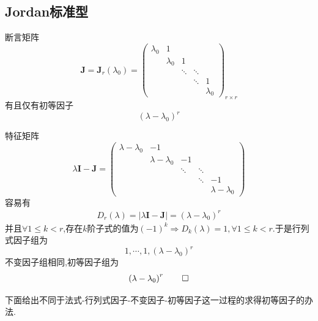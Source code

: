 \subsection{Jordan标准型}
\begin{green}
    \begin{lemma}[Jordan块]\label{lemma:Jordan块}
        断言矩阵
        \[
        \bm{J}=\bm{J}_r\left(\lambda_0\right)=\begin{pmatrix}
           \lambda_0&1&&&\\
              &\lambda_0&1&&\\
                &&\ddots&\ddots&\\
                &&&\ddots&1\\
                &&&&\lambda_0
        \end{pmatrix}_{r\times r}
        \]有且仅有初等因子
    \[
    \left(
        \lambda-\lambda_0
    \right)^r
    \]
    \end{lemma}
    \begin{Proof}
        特征矩阵\[
        \lambda\bm{I}-\bm{J}=\begin{pmatrix}
            \lambda-\lambda_0&-1&&&\\
            &\lambda-\lambda_0&-1&&\\
            &&\ddots&\ddots&\\
            &&&\ddots&-1\\
            &&&&\lambda-\lambda_0
        \end{pmatrix}
        \]容易有\begin{align*}
            D_r\left(\lambda\right)=\left|\lambda\bm{I}-\bm{J}\right|=\left(\lambda-\lambda_0\right)^r
        \end{align*}并且$\forall 1\leqslant k<r$,存在$k$阶子式的值为$\left(-1\right)^k\Longrightarrow D_k\left(\lambda\right)=1,\forall 1\leqslant k<r.$于是行列式因子组为\[
        1,\cdots,1,\left(\lambda-\lambda_0\right)^r
        \]不变因子组相同,初等因子组为\[
        \left(\lambda-\lambda_0\right)^r\qedhere
        \]
    \end{Proof}
\end{green}
下面给出不同于法式-行列式因子-不变因子-初等因子这一过程的求得初等因子的办法.
